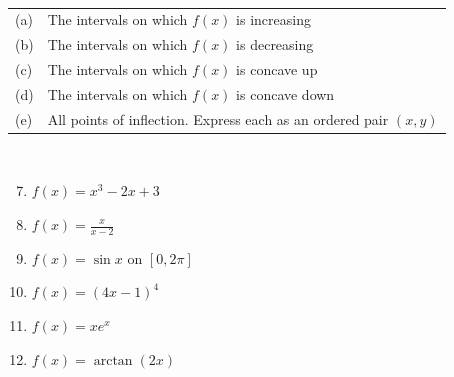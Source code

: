 \documentclass[12pt]{article}
\newif\ifans
\begin{document}
\\

\begin{tabular}{ll}
(a) & The intervals on which $f(x)$ is increasing\\
(b) & The intervals on which $f(x)$ is decreasing\\
(c) & The intervals on which $f(x)$ is concave up\\
(d) & The intervals on which $f(x)$ is concave down\\
(e) & All points of inflection.  Express each as an ordered pair $(x,y)$
\end{tabular}\\

\begin{enumerate}
\setcounter{enumi}{6}

\item $f(x) = x^3-2x+3$ 

\ifans{\fbox{a.$\left(-\infty, -\sqrt{\frac{2}{3}}\right)\cup \left(\sqrt{\frac{2}{3}}, \infty \right)$; b. $\left(-\sqrt{\frac{2}{3}},\sqrt{\frac{2}{3}}\right)$; c. $(0,\infty)$; d. $(-\infty,0)$; e. $(0,3)$}} \fi

\item $f(x) = \frac{x}{x-2}$ 

\ifans{\fbox{a. none; b. $(-\infty,2) \cup (2,\infty)$; c. $(2,\infty)$; d. $(-\infty, 2)$; e. none}} \fi

\item $f(x) = \sin{x} \text{ on } [0,2\pi]$ 

\ifans{\fbox{a. $\left[0, \frac{\pi}{2}\right)\cup \left(\frac{3\pi}{2},2\pi \right)$; b. $ \left(\frac{\pi}{2}, \frac{3\pi}{2} \right)$; c. $(\pi, 2\pi)$; d. $(0,\pi)$; e. $(\pi,0)$}} \fi

\item $f(x) = (4x-1)^4$ 

\ifans{\fbox{a.$\left(\frac{1}{4},\infty \right)$; b. $\left(-\infty, \frac{1}{4}\right)$; c. $\left(-\infty,\frac{1}{4}\right) \cup \left(\frac{1}{4},\infty \right)$; d. none; e. none}} \fi

\item $f(x) = xe^x$ 

\ifans{\fbox{a. $(-1, \infty)$; b. $(-\infty, -1)$; c. $(-2,\infty)$; d. $(-\infty, -2)$; e. $\left(-2,-\frac{2}{e^2}\right)$}} \fi

\item $f(x) = \arctan{(2x)}$ 


\end{enumerate}
\end{document}
